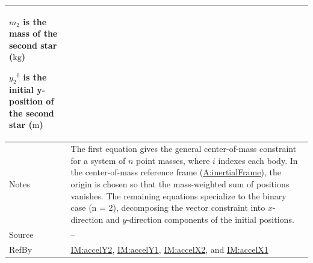 \documentclass[12pt]{article}
\begin{document}
\begin{minipage}{\textwidth}
\begin{tabular}{>{\raggedright}p{}>{\raggedright\arraybackslash}p{}}
\begin{symbDescription}
              \item{${m_{2}}$ is the mass of the second star (${\text{kg}}$)}
              \item{${{y_{2}}^{0}}$ is the initial y-position of the second star (${\text{m}}$)}
              \end{symbDescription}
\\ \midrule
Notes & The first equation gives the general center-of-mass constraint for a system of $n$ point masses, where $i$ indexes each body. In the center-of-mass reference frame (\hyperref[inertialFrame]{A:inertialFrame}), the origin is chosen so that the mass-weighted sum of positions vanishes. The remaining equations specialize to the binary case (n = 2), decomposing the vector constraint into $x$-direction and $y$-direction components of the initial positions.
        
\\ \midrule
Source & --
         
\\ \midrule
RefBy & \hyperref[IM:accelY2]{IM:accelY2}, \hyperref[IM:accelY1]{IM:accelY1}, \hyperref[IM:accelX2]{IM:accelX2}, and \hyperref[IM:accelX1]{IM:accelX1}
        
\\ \bottomrule
\end{tabular}
\end{minipage}
\end{document}
